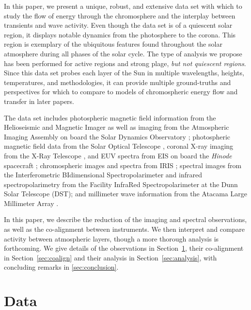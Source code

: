 \documentclass[twocolumn]{aastex62}
\begin{document}
In this paper, we present a unique, robust, and extensive data set with which to study the flow of energy through the chromosphere and the interplay between transients and wave activity. 
Even though the data set is of a quiescent solar region, it displays notable dynamics from the photosphere to the corona. 
This region is exemplary of the ubiquitous features found throughout the solar atmosphere during all phases of the solar cycle. 
The type of analysis we propose has been performed for active regions and strong plage, \emph{but not quiescent regions}. 
Since this data set probes each layer of the Sun in multiple wavelengths, heights, temperatures, and methodologies, it can provide multiple ground-truths and perspectives for which to compare to models of chromospheric energy flow and transfer in later papers.

The data set includes photospheric magnetic field information from the Helioseismic and Magnetic Imager \citep[HMI,][]{2012SchouEA_HMI} as well as imaging from the Atmospheric Imaging Assembly \citep[AIA,][]{2012LemenEA_AIA} on board the Solar Dynamics Observatory \citep[SDO,][]{2012PesnellEA_SDO}; photospheric magnetic field data from the Solar Optical Telescope \citep[SOT,][]{2008TsunetaEA_SOT}, coronal X-ray imaging from the X-Ray Telescope \citep[XRT,][]{2007GolubEA_XRT}, and EUV spectra from EIS \citep{2007CulhaneEA_EIS} on board the {\it Hinode} spacecraft \citep[][]{2007KosugiEA_Hinode}; chromospheric images and spectra from IRIS \citep{2014DePontieuEA_IRIS}; spectral images from the  Interferometric BIdimensional Spectropolarimeter \citep[IBIS,][]{2006Cavallini_IBIS} and infrared spectropolarimetry from the Facility InfraRed Spectropolarimeter \citep[FIRS,][]{2010JaeggliEA_FIRS} at the Dunn Solar Telescope (DST); and millimeter wave information from the Atacama Large Millimeter Array \citep[ALMA,][]{2009WootenThompson_ALMA, 2010HillsEA_ALMA2}.

In this paper, we describe the reduction of the imaging and spectral observations, as well as the co-alignment between instruments. 
We then interpret and compare activity between atmospheric layers, though a more thorough analysis is forthcoming.  
We give details of the observations in Section~\ref{sec:data}, their co-alignment in Section~\ref{sec:coalign} and their analysis in Section~\ref{sec:analysis}, with concluding remarks in \ref{sec:conclusion}. 

\section{Data} \label{sec:data}
\end{document}
